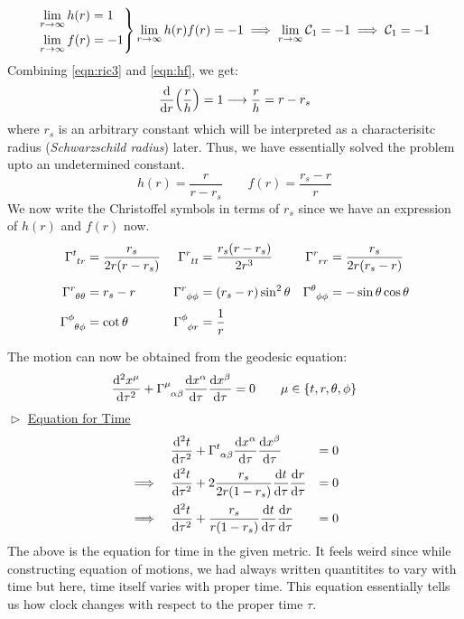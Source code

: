 \begin{equation}\label{eqn:hf}
    \begin{rcases}
        \lim\limits_{r\to \infty} h(r) = 1 \\
        \lim\limits_{r\to \infty} f(r) = -1
    \end{rcases}
    \lim\limits_{r\to \infty} h(r)f(r) = -1 \implies \lim\limits_{r\to\infty } \mathcal C_1 = -1 \implies \mathcal C_1 = -1
\end{equation}
Combining \eqref{eqn:ric3} and \eqref{eqn:hf}, we get:
$$\dv{r}\qty(\frac{r}{h}) = 1 \longrightarrow \frac{r}{h} = r - r_s$$ 
where $r_s$ is an arbitrary constant which will be interpreted as a characterisitc radius (\textit{Schwarzschild radius}) later. Thus, we have essentially solved the problem upto an undetermined constant. 
$$h(r) = \frac{r}{r-r_s}\qquad f(r) = \frac{r_s-r}{r}$$
We now write the Christoffel symbols in terms of $r_s$ since we have an expression of $h(r)$ and $f(r)$ now.
\[
\begin{aligned}
\chris{t}{t}{r} &= \frac{r_s}{2r(r-r_s)} &
\chris{r}{t}{t} &= \frac{r_s(r-r_s)}{2r^3} &
\chris{r}{r}{r} &= \frac{r_s}{2r(r_s-r)} \\[2mm]
\chris{r}{\theta}{\theta} &= r_s-r &
\chris{r}{\phi}{\phi} &= (r_s-r)\sin^2\theta  &
\chris{\theta}{\phi}{\phi} &= -\sin\theta\cos\theta \\[1mm]
\chris{\phi}{\theta}{\phi} &= \cot\theta &
\chris{\phi}{\phi}{r} &= \frac{1}{r} &
&
\end{aligned}
\]

The motion can now be obtained from the geodesic equation: 
$$\dv[2]{{x^\mu}}{{\tau}} + \chris{\mu}{\alpha}{\beta}\dv{{x^\alpha}}{\tau}\dv{{x^\beta}}{\tau}=0 \qquad \mu \in \{t,r,\theta,\phi\}$$
$\vartriangleright$ \underline{Equation for Time}
\begin{alignat*}{3}
    &\dv[2]{{t}}{{\tau}} + \chris{t}{\alpha}{\beta}\dv{{x^\alpha}}{\tau}\dv{{x^\beta}}{\tau}&=0\\
    \implies\quad &\dv[2]{{t}}{{\tau}} + 2\frac{r_s}{2r(1-r_s)} \dv{{t}}{\tau}\dv{{r}}{\tau}&=0\\
    \implies\quad &\dv[2]{{t}}{{\tau}} + \frac{r_s}{r(1-r_s)}\dv{{t}}{\tau}\dv{{r}}{\tau}&= 0
\end{alignat*}
The above is the equation for time in the given metric. It feels weird since while constructing equation of motions, we had always written quantitites to vary with time but here, time itself varies with proper time. This equation essentially tells us how clock changes with respect to the proper time $\tau$. 